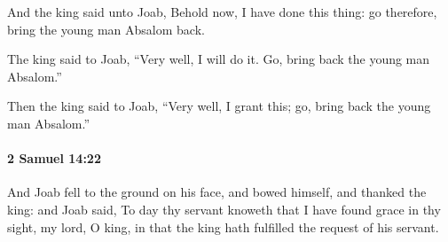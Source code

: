 			\begin{versebox}
					\item[BHS] 
					\item[ASV] And the king said unto Joab, Behold now, I have done this thing: go therefore, bring the young man Absalom back.
					\item[NIV] The king said to Joab, “Very well, I will do it. Go, bring back the young man Absalom.”
					\item[NRSV] Then the king said to Joab, “Very well, I grant this; go, bring back the young man Absalom.”
			\end{versebox}

		\paragraph{2 Samuel 14:22} %
			\label{2SAMUEL-14-22}

			And Joab fell to the ground on his face, and bowed himself, and thanked the king: and Joab said, To day thy servant knoweth that I have found grace in thy sight, my lord, O king, in that the king hath fulfilled the request of his servant.


